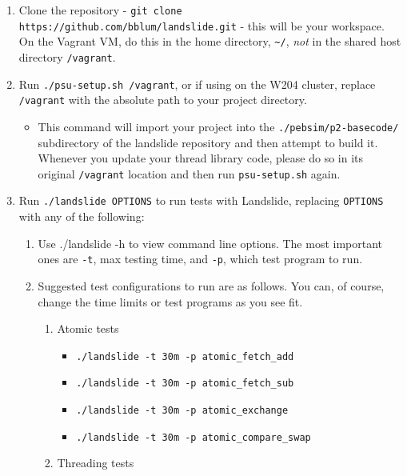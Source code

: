 \documentclass{article}
\begin{document}
\begin{enumerate}
	\item Clone the repository - {\tt git clone https://github.com/bblum/landslide.git} - this will be your workspace.
		On the Vagrant VM, do this in the home directory, {\tt \textasciitilde{}/},
		{\em not} in the shared host directory {\tt /vagrant}.
	\item Run {\tt ./psu-setup.sh /vagrant},
		or if using on the W204 cluster, replace {\tt /vagrant} with the absolute path to your project directory.
		\begin{itemize}
			\item This command will import your project into the {\tt ./pebsim/p2-basecode/} subdirectory of the landslide repository and then attempt to build it.
				Whenever you update your thread library code, please do so in its original {\tt /vagrant} location
				and then run {\tt psu-setup.sh} again.
		\end{itemize}
	\item Run {\tt ./landslide OPTIONS} to run tests with Landslide, replacing {\tt OPTIONS} with any of the following:
		\begin{enumerate}
			\item Use ./landslide -h to view command line options. The most important ones are {\tt -t}, max testing
				time, and {\tt -p}, which test program to run.
			\item Suggested test configurations to run are as follows.
				You can, of course, change the time limits or test programs as you see fit.
				\begin{enumerate}
					\item Atomic tests
					\begin{itemize}
						\item \texttt{./landslide -t 30m -p atomic\_fetch\_add}
						\item \texttt{./landslide -t 30m -p atomic\_fetch\_sub}
						\item \texttt{./landslide -t 30m -p atomic\_exchange}
						\item \texttt{./landslide -t 30m -p atomic\_compare\_swap}
					\end{itemize}
					\item Threading tests

\end{enumerate}
\end{enumerate}
\end{enumerate}
\end{document}
